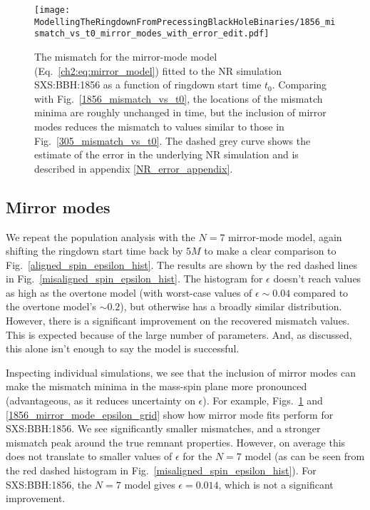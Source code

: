 \begin{figure}[t]
    \centering
    \texttt{[image: ModellingTheRingdownFromPrecessingBlackHoleBinaries/1856\_mismatch\_vs\_t0\_mirror\_modes\_with\_error\_edit.pdf]}
    \caption[Mismatch as a function of ringdown start time for the mirror-mode model fitted to SXS:BBH:1856]{ 
    The mismatch for the mirror-mode model (Eq.~\ref{ch2:eq:mirror_model}) fitted to the NR simulation SXS:BBH:1856 as a function of ringdown start time $t_0$. Comparing with Fig.~\ref{1856_mismatch_vs_t0}, the locations of the mismatch minima are roughly unchanged in time, but the inclusion of mirror modes reduces the mismatch to values similar to those in Fig.~\ref{305_mismatch_vs_t0}. The dashed grey curve shows the estimate of the error in the underlying NR simulation and is described in appendix \ref{NR_error_appendix}.
    }
    \label{1856_mirror_mode_mismatch_vs_t0}
\end{figure}


\subsection{Mirror modes} \label{subsec:misaligned_mirror_modes}

We repeat the population analysis with the $N=7$ mirror-mode model, again shifting the ringdown start time back by $5M$ to make a clear comparison to Fig.~\ref{aligned_spin_epsilon_hist}. 
The results are shown by the red dashed lines in Fig.~\ref{misaligned_spin_epsilon_hist}. The histogram for $\epsilon$ doesn't reach values as high as the overtone model (with worst-case values of $\epsilon \sim 0.04$ compared to the overtone model's $\sim 0.2$), but otherwise has a broadly similar distribution.
However, there is a significant improvement on the recovered mismatch values. This is expected because of the large number of parameters. And, as discussed, this alone isn't enough to say the model is successful.

Inspecting individual simulations, we see that the inclusion of mirror modes can make the mismatch minima in the mass-spin plane more pronounced (advantageous, as it reduces uncertainty on $\epsilon$). For example, Figs.~\ref{1856_mirror_mode_mismatch_vs_t0} and \ref{1856_mirror_mode_epsilon_grid} show how mirror mode fits perform for SXS:BBH:1856. 
We see significantly smaller mismatches, and a stronger mismatch peak around the true remnant properties. However, on average this does not translate to smaller values of $\epsilon$ for the $N=7$ model (as can be seen from the red dashed histogram in Fig.~\ref{misaligned_spin_epsilon_hist}). For SXS:BBH:1856, the $N=7$ model gives $\epsilon = 0.014$, which is not a significant improvement.

